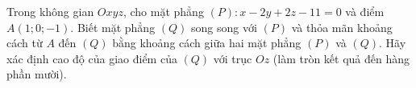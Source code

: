 \begin{ex}
Trong không gian $Oxyz$, cho mặt phẳng $(P)\colon x-2y+2z-11=0$ và điểm $A(1;0;-1)$. Biết mặt phẳng $(Q)$ song song với $(P)$ và thỏa mãn khoảng cách từ $A$ đến $(Q)$ bằng khoảng cách giữa hai mặt phẳng $(P)$ và $(Q)$. Hãy xác định cao độ của giao điểm của $(Q)$ với trục $Oz$ (làm tròn kết quả đến hàng phần mười).
\end{ex}
